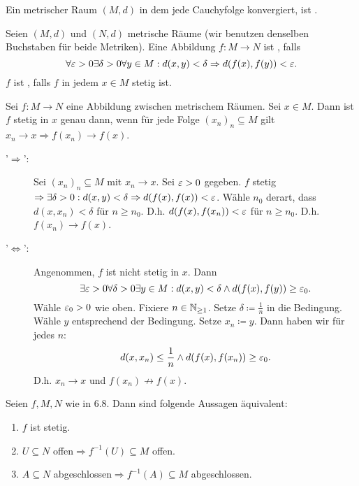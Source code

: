 \begin{definition}
	Ein metrischer Raum $ (M,d) $ in dem jede Cauchyfolge konvergiert, ist .
\end{definition}
\begin{definition}
	Seien $ (M,d) $ und $ (N,d) $ metrische R\"aume (wir benutzen denselben Buchstaben f\"ur beide Metriken). Eine Abbildung $ f\colon M\rightarrow N $ ist , falls
	\[ \forall\varepsilon>0\exists\delta>0\forall y\in M: d(x,y)<\delta\Rightarrow d(f(x),f(y))<\varepsilon. \]
	$ f $ ist , falls $ f $ in jedem $ x\in M $ stetig ist.
\end{definition}
\begin{lemma}
	Sei $ f\colon M\rightarrow N $ eine Abbildung zwischen metrischem R\"aumen. Sei $ x\in M $. Dann ist $ f $ stetig in $ x $ genau dann, wenn f\"ur jede Folge $ (x_n)_n\subseteq M $ gilt $ x_n\to x\Rightarrow f(x_n)\to f(x) $.
\end{lemma}
\begin{beweis}
	\begin{description}
		\item['$ \Rightarrow $':] Sei $ (x_n)_n\subseteq M $ mit $ x_n\to x $. Sei $ \varepsilon>0 $ gegeben. $ f $ stetig$ \Rightarrow \exists \delta>0:d(x,y)<\delta\Rightarrow d(f(x),f(x))<\varepsilon $. W\"ahle $ n_0 $ derart, dass $ d(x,x_n)<\delta $ f\"ur $ n\geq n_0 $. D.h. $ d(f(x),f(x_n))<\varepsilon $ f\"ur $ n\geq n_0 $. D.h. $ f(x_n)\to f(x) $.
		\item['$ \Leftrightarrow $':] Angenommen, $ f $ ist nicht stetig in $ x $. Dann \[ \exists\varepsilon>0\forall\delta>0\exists y\in M:d(x,y)<\delta\wedge d(f(x),f(y))\geq\varepsilon_0. \]
		W\"ahle $ \varepsilon_0>0 $ wie oben. Fixiere $ n\in\mathbb{N}_{\geq 1} $. Setze $ \delta\coloneqq\frac{1}{n} $ in die Bedingung. W\"ahle $ y $ entsprechend der Bedingung. Setze $ x_n\coloneqq y $. Dann haben wir f\"ur jedes $ n $:
		\[ d(x,x_n)\leq\frac{1}{n}\wedge d(f(x),f(x_n))\geq\varepsilon_0. \]
		D.h. $ x_n\to x $ und $ f(x_n)\not\to f(x) $.
	\end{description}
\end{beweis}
\newpage
\begin{lemma}
	Seien $ f,M,N $ wie in 6.8. Dann sind folgende Aussagen \"aquivalent:
	\begin{enumerate}
		\item $ f $ ist stetig.
		\item $ U\subseteq N $ offen$ \Rightarrow f^{-1}(U)\subseteq M $ offen.
		\item $ A\subseteq N $ abgeschlossen$ \Rightarrow f^{-1}(A)\subseteq M $ abgeschlossen.
	\end{enumerate}
\end{lemma}
